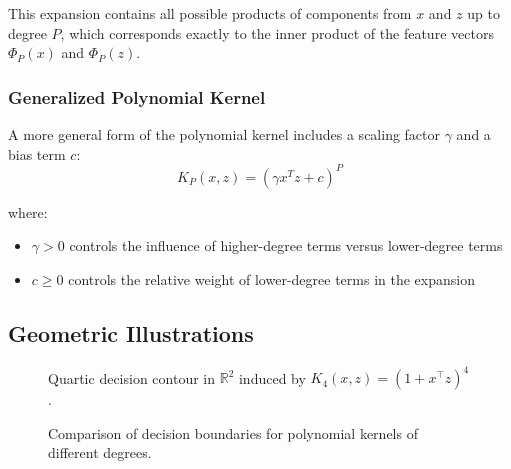\documentclass[11pt]{article}
\begin{document}
This expansion contains all possible products of components from $x$ and $z$ up to degree $P$, which corresponds exactly to the inner product of the feature vectors $\Phi_P(x)$ and $\Phi_P(z)$.

\subsubsection{Generalized Polynomial Kernel}
A more general form of the polynomial kernel includes a scaling factor $\gamma$ and a bias term $c$:
\[
K_P(x,z) = (\gamma x^Tz + c)^P
\]

where:
\begin{itemize}
    \item $\gamma > 0$ controls the influence of higher-degree terms versus lower-degree terms
    \item $c \geq 0$ controls the relative weight of lower-degree terms in the expansion
\end{itemize}

\subsection{Geometric Illustrations}
\begin{figure}[h]
  \centering
  \caption{Quartic decision contour in $\mathbb{R}^2$ induced by $K_4(x,z)=(1+x^\top z)^4$.}
\end{figure}

\begin{figure}[h]
  \centering
  \caption{Comparison of decision boundaries for polynomial kernels of different degrees.}
\end{figure}
\end{document}
